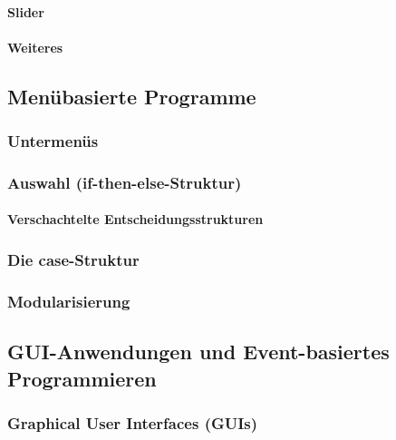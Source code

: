 \documentclass[a4paper, 11pt, accentcolor = tud3b]{tudreport}
\begin{document}
					\paragraph{Slider} %

					\paragraph{Weiteres} %

			\subsection{Menübasierte Programme} %

				\subsubsection{Untermenüs} %

				\subsubsection{Auswahl (if-then-else-Struktur)} %

					\paragraph{Verschachtelte Entscheidungsstrukturen} %

				\subsubsection{Die case-Struktur} %

				\subsubsection{Modularisierung} %

			\subsection{GUI-Anwendungen und Event-basiertes Programmieren} %

				\subsubsection{Graphical User Interfaces (GUIs)} %
\end{document}
